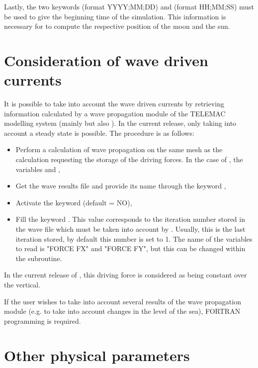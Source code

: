 Lastly, the two keywords  (format YYYY;MM;DD) and
 (format HH;MM;SS) must be used to give the
beginning time of the simulation.  This information is necessary for 
to compute the respective position of the moon and the sun.

\section{Consideration of wave driven currents}

It is possible to take into account the wave driven currents by retrieving
information calculated by a wave propagation module of the TELEMAC modelling
system (mainly \tomawac but also \artemis). In the current release,
only taking into account a steady state is possible. The procedure is as
follows:

\begin{itemize}
\item  Perform a calculation of wave propagation on the same mesh as the
 calculation requesting the storage of the driving forces. In the
case of \tomawac, the variables  and ,

\item  Get the wave results file and provide its name through the keyword
,

\item  Activate the keyword  (default = NO),

\item  Fill the keyword . This value
corresponds to the iteration number stored in the wave file which must be taken
into account by . Usually, this is the last iteration stored, by
default this number is set to 1. The name of the variables to read is "FORCE
FX" and "FORCE FY", but this can be changed within the  subroutine.
\end{itemize}

In the current release of , this driving force is considered as being
constant over the vertical.

If the user wishes to take into account several results of the wave propagation
module (e.g. to take into account changes in the level of the sea), FORTRAN
programming is required.

\section{Other physical parameters}

